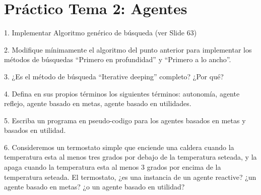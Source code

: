 \chapter{Práctico Tema 2: Agentes}

1. Implementar Algoritmo genérico de búsqueda (ver Slide 63)

2. Modifique mínimamente el algoritmo del punto anterior para implementar los métodos de búsquedas “Primero en profundidad” y “Primero a lo ancho”.

3. ¿Es el método de búsqueda “Iterative deeping” completo? ¿Por qué?

4. Defina en sus propios términos los siguientes términos: autonomía, agente reflejo, agente basado en metas, agente basado en utilidades.

5. Escriba un programa en pseudo-codigo para los agentes basados en metas y basados en utilidad.

6. Consideremos un termostato simple que enciende una caldera cuando la temperatura esta al menos tres grados por debajo de la temperatura seteada, y la apaga cuando la temperatura esta al menos 3 grados por encima de la temperatura seteada. El termostato, ¿es una instancia de un agente reactive? ¿un agente basado en metas? ¿o un agente basado en utilidad?\textbf{}

\bigskip